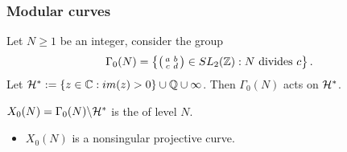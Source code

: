 \documentclass[handout]{beamer}
\begin{document}

\begin{frame}
\frametitle{Modular curves}
Let $N \geq 1$ be an integer, consider the group 
\[
	\Gamma_0(N) = \left \{ \left( \begin{smallmatrix}a&b\\c&d\end{smallmatrix}\right) \in SL_2(\mathbb{Z}):  N \mbox{ divides } c \right\}.
\]
Let $\mathcal{H}^* := \{z \in \mathbb{C}: im(z) > 0\} \cup \mathbb{Q} \cup \infty$. Then $\Gamma_0(N)$ acts on $\mathcal{H}^{*}$. 

\begin{Def}
$X_0(N) = \Gamma_0(N) \backslash \mathcal{H}^*$ is the  of level $N$. 
\end{Def}

\begin{itemize}
\item $X_0(N)$ is a  nonsingular projective curve.
\end{itemize}
\end{frame}
\end{document}
